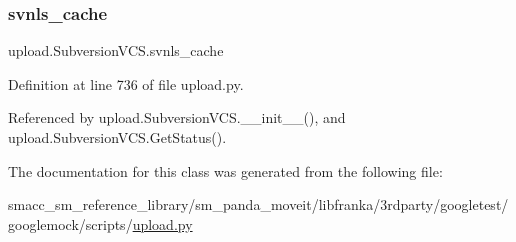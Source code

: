\subsubsection{\texorpdfstring{svnls\+\_\+cache}{svnls\_cache}}
{\footnotesize\ttfamily upload.\+Subversion\+V\+C\+S.\+svnls\+\_\+cache}



Definition at line 736 of file upload.\+py.



Referenced by upload.\+Subversion\+V\+C\+S.\+\_\+\+\_\+init\+\_\+\+\_\+(), and upload.\+Subversion\+V\+C\+S.\+Get\+Status().



The documentation for this class was generated from the following file\+:\begin{DoxyCompactItemize}
\item 
smacc\+\_\+sm\+\_\+reference\+\_\+library/sm\+\_\+panda\+\_\+moveit/libfranka/3rdparty/googletest/googlemock/scripts/\hyperlink{googlemock_2scripts_2upload_8py}{upload.\+py}\end{DoxyCompactItemize}
